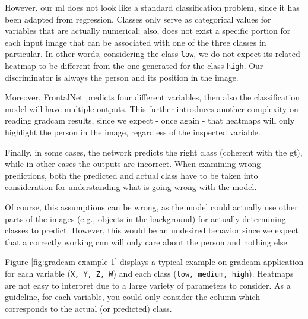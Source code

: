\medskip

However, our \gls{ml} does not look like a standard classification problem, since it has been adapted from regression. Classes only serve as categorical values for variables that are actually numerical; also, does not exist a specific portion for each input image that can be associated with one of the three classes in particular. In other words, considering the class \texttt{low}, we do not expect its related heatmap to be different from the one generated for the class \texttt{high}. Our discriminator is always the person and its position in the image.

Moreover, FrontalNet predicts four different variables, then also the classification model will have multiple outputs. This further introduces another complexity on reading \gls{gradcam} results, since we expect - once again - that heatmaps will only highlight the person in the image, regardless of the inspected variable.

Finally, in some cases, the network predicts the right class (coherent with the \gls{gt}), while in other cases the outputs are incorrect. When examining wrong predictions, both the predicted and actual class have to be taken into consideration for understanding what is going wrong with the model.

Of course, this assumptions can be wrong, as the model could actually use other parts of the images (e.g., objects in the background) for actually determining classes to predict. However, this would be an undesired behavior since we expect that a correctly working \gls{cnn} will only care about the person and nothing else.

\bigskip

Figure \ref{fig:gradcam-example-1} displays a typical example on \gls{gradcam} application for each variable (\texttt{X, Y, Z, W}) and each class (\texttt{low, medium, high}). Heatmaps are not easy to interpret due to a large variety of parameters to consider. As a guideline, for each variable, you could only consider the column which corresponds to the actual (or predicted) class.

